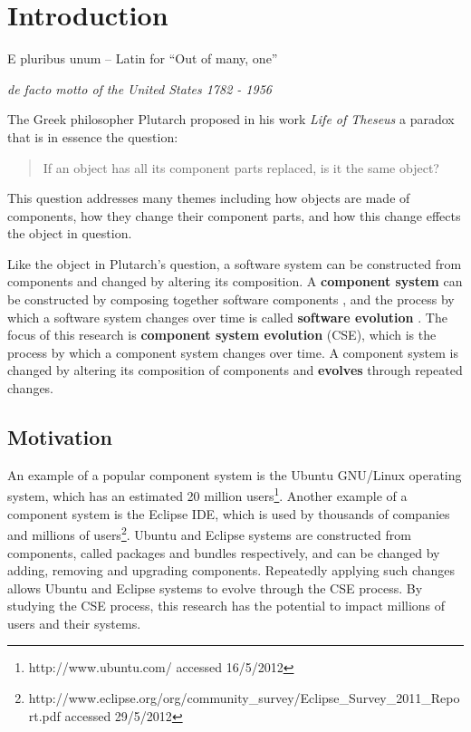\chapter{Introduction}
\label{introduction}
\epigraph{E pluribus unum -- Latin for ``Out of many, one''}
{\textit{de facto motto of the United States 1782 - 1956}}
The Greek philosopher Plutarch proposed in his work \textit{Life of Theseus} a paradox that is in essence the question:
\begin{quote}
If an object has all its component parts replaced, is it the same object?
\end{quote}
This question addresses many themes including how objects are made of components, how they change their component parts,
and how this change effects the object in question.

Like the object in Plutarch's question, a software system can be constructed from components and changed by altering its composition.
A \textbf{component system} can be constructed by composing together software components \citep{Szyperski2002},
and the process by which a software system changes over time is called \textbf{software evolution} \citep{lehman1980}.
The focus of this research is \textbf{component system evolution} (CSE), which is the process by which a component system changes over time.
A component system is changed by altering its composition of components and \textbf{evolves} through repeated changes.

\section{Motivation}

An example of a popular component system is the Ubuntu GNU/Linux operating system, which has an estimated 20 million users\footnote{http://www.ubuntu.com/ accessed 16/5/2012}. 
Another example of a component system is the Eclipse IDE, which is used by thousands of companies and millions of users\footnote{http://www.eclipse.org/org/community\_survey/Eclipse\_Survey\_2011\_Report.pdf  accessed 29/5/2012}.
Ubuntu and Eclipse systems are constructed from components, called packages and bundles respectively, 
and can be changed by adding, removing and upgrading components.
Repeatedly applying such changes allows Ubuntu and Eclipse systems to evolve through the CSE process.
By studying the CSE process,
this research has the potential to impact millions of users and their systems.

